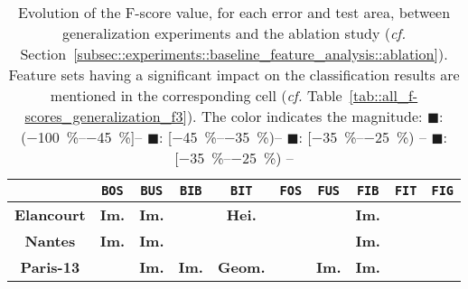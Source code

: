         \begin{table}[htbp]
            \footnotesize 
            \centering
            \renewcommand{\arraystretch}{2}
            \begin{tabular}{| c | c c c c |c c c c c|}
                \hline
                & \texttt{BOS} & \texttt{BUS} & \texttt{BIB} & \texttt{BIT} & \texttt{FOS} & \texttt{FUS} & \texttt{FIB} & \texttt{FIT} & \texttt{FIG} \\
                \hline
                \textbf{Elancourt} & \cellcolor{LOSS3545} \textbf{Im.} & \cellcolor{LOSS3545} \textbf{Im.} & \cellcolor{LOSS2535} & \cellcolor{LOSS1525} \textbf{Hei.} & \cellcolor{STBL} & \cellcolor{GAIN45} & \cellcolor{GAIN2535} \textbf{Im.} & \cellcolor{LOSS1525} & \cellcolor{GAIN0515} \\
                \textbf{Nantes} & \cellcolor{STBL} \textbf{Im.} & \cellcolor{LOSS1525} \textbf{Im.} &  & \cellcolor{GAIN1525} & \cellcolor{STBL} & \cellcolor{STBL} & \cellcolor{LOSS0515} \textbf{Im.} & & \cellcolor{STBL} \\
                \textbf{Paris-13} & \cellcolor{LOSS0515} & \cellcolor{STBL} \textbf{Im.} & \cellcolor{GAIN1525} \textbf{Im.} & \cellcolor{GAIN0515} \textbf{Geom.} & \cellcolor{STBL} & \cellcolor{LOSS45} \textbf{Im.} & \cellcolor{STBL} \textbf{Im.} & \cellcolor{GAIN0515} & \cellcolor{LOSS0515} \\
                \hline
            \end{tabular}
            \renewcommand{\arraystretch}{1}
            \caption[
                Evolution of the F-score value, for each error and test area, between generalization experiments and the ablation study.
            ]{
                \label{tab::generalization_comparison}
                Evolution of the F-score value, for each error and test area, between generalization experiments and the ablation study (\textit{cf.} Section~\ref{subsec::experiments::baseline_feature_analysis::ablation}).
                Feature sets having a significant impact on the classification results are mentioned in the corresponding cell (\textit{cf.} Table~\ref{tab::all_f-scores_generalization_f3}).
                The color indicates the magnitude:
                \textcolor{LOSS45}{\(\blacksquare\)}: (\SIrange[range-phrase={,  }]{-100}{-45}{\percent}]--
                \textcolor{LOSS3545}{\(\blacksquare\)}: [\SIrange[range-phrase={,  }]{-45}{-35}{\percent})--
                \textcolor{LOSS2535}{\(\blacksquare\)}: [\SIrange[range-phrase={, }]{-35}{-25}{\percent}) --
                \textcolor{LOSS1525}{\(\blacksquare\)}: [\SIrange[range-phrase={, }]{-35}{-25}{\percent}) --
}
\end{table}
